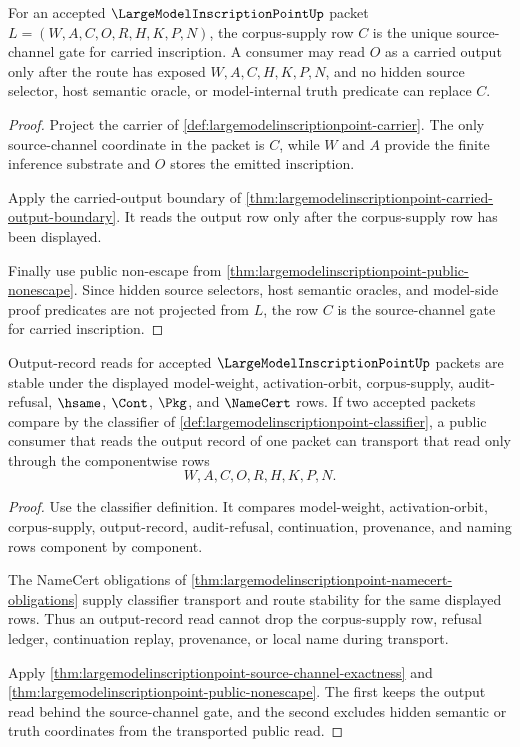 \begin{theorem}
\label{thm:largemodelinscriptionpoint-source-channel-exactness}
For an accepted $\LargeModelInscriptionPointUp$ packet $L=(W,A,C,O,R,H,K,P,N)$, the corpus-supply row $C$ is the unique source-channel gate for carried inscription. A consumer may read $O$ as a carried output only after the route has exposed $W,A,C,H,K,P,N$, and no hidden source selector, host semantic oracle, or model-internal truth predicate can replace $C$.
\end{theorem}
\begin{proof}
Project the carrier of \autoref{def:largemodelinscriptionpoint-carrier}. The only source-channel coordinate in the packet is $C$, while $W$ and $A$ provide the finite inference substrate and $O$ stores the emitted inscription.

Apply the carried-output boundary of \autoref{thm:largemodelinscriptionpoint-carried-output-boundary}. It reads the output row only after the corpus-supply row has been displayed.

Finally use public non-escape from \autoref{thm:largemodelinscriptionpoint-public-nonescape}. Since hidden source selectors, host semantic oracles, and model-side proof predicates are not projected from $L$, the row $C$ is the source-channel gate for carried inscription.
\end{proof}

\begin{theorem}
\label{thm:largemodelinscriptionpoint-output-record-stability}
Output-record reads for accepted $\LargeModelInscriptionPointUp$ packets are stable under the displayed model-weight, activation-orbit, corpus-supply, audit-refusal, $\hsame$, $\Cont$, $\Pkg$, and $\NameCert$ rows. If two accepted packets compare by the classifier of \autoref{def:largemodelinscriptionpoint-classifier}, a public consumer that reads the output record of one packet can transport that read only through the componentwise rows
$$
W,A,C,O,R,H,K,P,N.
$$
\end{theorem}
\begin{proof}
Use the classifier definition. It compares model-weight, activation-orbit, corpus-supply, output-record, audit-refusal, continuation, provenance, and naming rows component by component.

The NameCert obligations of \autoref{thm:largemodelinscriptionpoint-namecert-obligations} supply classifier transport and route stability for the same displayed rows. Thus an output-record read cannot drop the corpus-supply row, refusal ledger, continuation replay, provenance, or local name during transport.

Apply \autoref{thm:largemodelinscriptionpoint-source-channel-exactness} and \autoref{thm:largemodelinscriptionpoint-public-nonescape}. The first keeps the output read behind the source-channel gate, and the second excludes hidden semantic or truth coordinates from the transported public read.
\end{proof}

